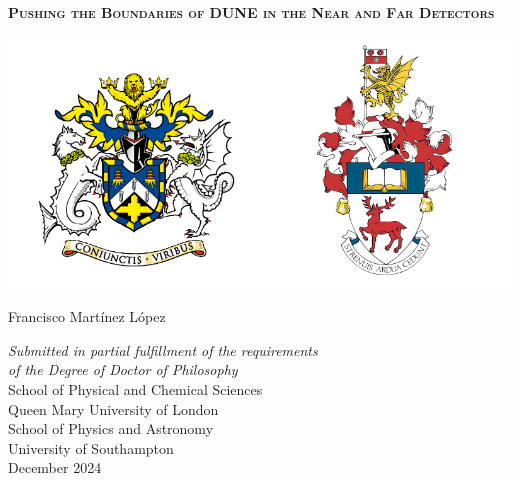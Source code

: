 \begin{titlepage}



\begin{center}

\begin{spacing}{2.5}
{\Huge \textsc{\textbf{Pushing the Boundaries of DUNE in the Near and Far Detectors}}}
\end{spacing}

\vspace{1.0 cm}

\begin{center}
\includegraphics[width=1.0\textwidth]{Images/uni_arms}
\end{center}
\vspace{0.9cm}


{\LARGE Francisco Mart\'{i}nez L\'{o}pez} %

\vspace{1cm}


{\large %
\textit{Submitted in partial fulfillment of the
requirements \\ of the Degree of Doctor of Philosophy}\\
\vspace{0.9 cm}
School of Physical and Chemical Sciences\\
Queen Mary University of London\\
\vspace{0.5 cm}
School of Physics and Astronomy\\
University of Southampton\\
\vspace{0.5cm}
December 2024 %
}

\end{center}



\end{titlepage}

\restoregeometry  %
\doublespacing		%
